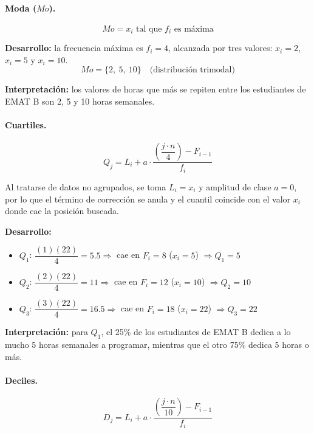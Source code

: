 \documentclass[12pt,letterpaper]{article}
\begin{document}
\paragraph{Moda ($Mo$).}
$$Mo = x_i \text{ tal que } f_i \text{ es máxima}$$

\noindent\textbf{Desarrollo:} la frecuencia máxima es $f_i = 4$, alcanzada por tres valores: $x_i = 2$, $x_i = 5$ y $x_i = 10$.
$$Mo = \{2,\ 5,\ 10\} \quad \text{(distribución trimodal)}$$

\noindent\textbf{Interpretación:} los valores de horas que más se repiten entre los estudiantes de EMAT B son 2, 5 y 10 horas semanales.

\paragraph{Cuartiles.}
$$Q_j = L_i + a \cdot \frac{\left(\dfrac{j \cdot n}{4}\right) - F_{i-1}}{f_i}$$

\noindent Al tratarse de datos no agrupados, se toma $L_i = x_i$ y amplitud de clase $a = 0$, por lo que el término de corrección se anula y el cuantil coincide con el valor $x_i$ donde cae la posición buscada.

\noindent\textbf{Desarrollo:}
\begin{itemize}[nosep]
    \item $Q_1$: $\dfrac{(1)(22)}{4}=5.5 \Rightarrow$ cae en $F_i=8$ ($x_i=5$) $\Rightarrow Q_1 = 5$
    \item $Q_2$: $\dfrac{(2)(22)}{4}=11 \Rightarrow$ cae en $F_i=12$ ($x_i=10$) $\Rightarrow Q_2 = 10$
    \item $Q_3$: $\dfrac{(3)(22)}{4}=16.5 \Rightarrow$ cae en $F_i=18$ ($x_i=22$) $\Rightarrow Q_3 = 22$
\end{itemize}

\noindent\textbf{Interpretación:} para $Q_1$, el 25\% de los estudiantes de EMAT B dedica a lo mucho 5 horas semanales a programar, mientras que el otro 75\% dedica 5 horas o más.

\paragraph{Deciles.}
$$D_j = L_i + a \cdot \frac{\left(\dfrac{j \cdot n}{10}\right) - F_{i-1}}{f_i}$$
\end{document}
